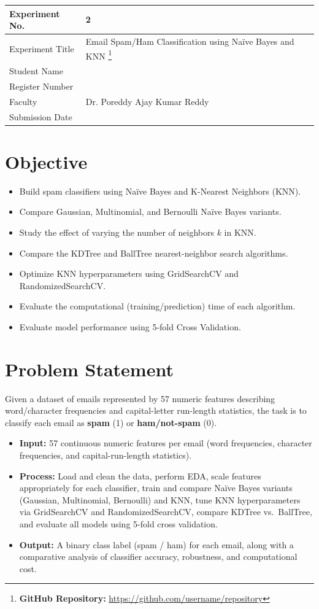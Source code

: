 \documentclass[12pt,a4paper]{article}
\begin{document}
\begin{tabular}{|p{4cm}|p{11cm}|}
\hline
Experiment No. & 2 \\ \hline
Experiment Title & Email Spam/Ham Classification using Na\"ive Bayes and KNN
\footnote{\textbf{GitHub Repository: }\url{https://github.com/username/repository}}\\ \hline
Student Name & \\ \hline
Register Number & \\ \hline
Faculty & Dr. Poreddy Ajay Kumar Reddy \\ \hline
Submission Date & \\ \hline
\end{tabular}

\section{Objective}
\begin{itemize}
\item Build spam classifiers using Na\"ive Bayes and K-Nearest Neighbors (KNN).
\item Compare Gaussian, Multinomial, and Bernoulli Na\"ive Bayes variants.
\item Study the effect of varying the number of neighbors $k$ in KNN.
\item Compare the KDTree and BallTree nearest-neighbor search algorithms.
\item Optimize KNN hyperparameters using GridSearchCV and RandomizedSearchCV.
\item Evaluate the computational (training/prediction) time of each algorithm.
\item Evaluate model performance using 5-fold Cross Validation.
\end{itemize}

\section{Problem Statement}
Given a dataset of emails represented by 57 numeric features describing word/character
frequencies and capital-letter run-length statistics, the task is to classify each email
as \textbf{spam} (1) or \textbf{ham/not-spam} (0).
\begin{itemize}
\item \textbf{Input:} 57 continuous numeric features per email (word frequencies,
character frequencies, and capital-run-length statistics).
\item \textbf{Process:} Load and clean the data, perform EDA, scale features
appropriately for each classifier, train and compare Na\"ive Bayes variants (Gaussian,
Multinomial, Bernoulli) and KNN, tune KNN hyperparameters via GridSearchCV and
RandomizedSearchCV, compare KDTree vs.\ BallTree, and evaluate all models using 5-fold
cross validation.
\item \textbf{Output:} A binary class label (spam / ham) for each email, along with a
comparative analysis of classifier accuracy, robustness, and computational cost.
\end{itemize}
\end{document}
